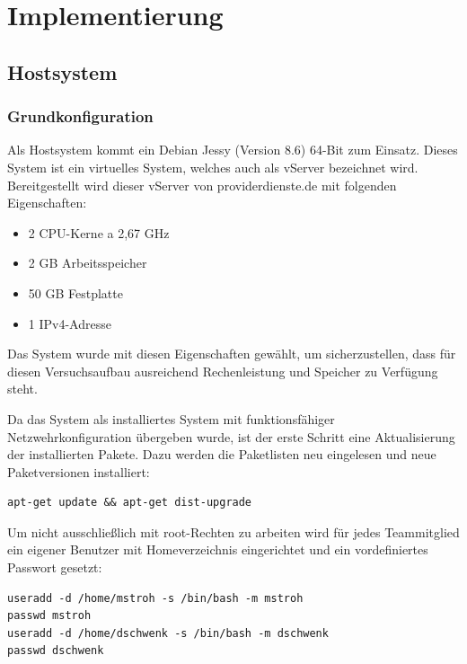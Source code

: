 \chapter{Implementierung}
\label{ch:Implementierung}

\section{Hostsystem}
\label{sec:Hostsystem}

\subsection{Grundkonfiguration}
\label{subsec:Grundkonfiguration}

Als Hostsystem kommt ein Debian Jessy (Version 8.6) 64-Bit zum Einsatz. Dieses System ist ein virtuelles System, welches auch als vServer bezeichnet wird. Bereitgestellt wird dieser vServer von providerdienste.de mit folgenden Eigenschaften:

\begin{itemize}
\item 2 CPU-Kerne a 2,67 GHz
\item 2 GB Arbeitsspeicher
\item 50 GB Festplatte
\item 1 IPv4-Adresse
\end{itemize}

Das System wurde mit diesen Eigenschaften gewählt, um sicherzustellen, dass für diesen Versuchsaufbau ausreichend Rechenleistung und Speicher zu Verfügung steht. 

Da das System als installiertes System mit funktionsfähiger Netzwehrkonfiguration übergeben wurde, ist der erste Schritt eine Aktualisierung der installierten Pakete. Dazu werden die Paketlisten neu eingelesen und neue Paketversionen installiert:

\begin{lstlisting}[style=customc]
apt-get update && apt-get dist-upgrade
\end{lstlisting}

Um nicht ausschließlich mit root-Rechten zu arbeiten wird für jedes Teammitglied ein eigener Benutzer mit Homeverzeichnis eingerichtet und ein vordefiniertes Passwort gesetzt:

\begin{lstlisting}[style=customc]
useradd -d /home/mstroh -s /bin/bash -m mstroh
passwd mstroh
useradd -d /home/dschwenk -s /bin/bash -m dschwenk
passwd dschwenk
\end{lstlisting}

